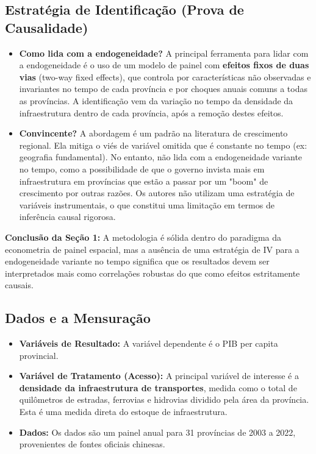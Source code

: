 \documentclass[12pt, a4paper]{article}
\begin{document}
\subsection{Estratégia de Identificação (Prova de Causalidade)}

\begin{itemize}
    \item \textbf{Como lida com a endogeneidade?} A principal ferramenta para lidar com a endogeneidade é o uso de um modelo de painel com \textbf{efeitos fixos de duas vias} (two-way fixed effects), que controla por características não observadas e invariantes no tempo de cada província e por choques anuais comuns a todas as províncias. A identificação vem da variação no tempo da densidade da infraestrutura dentro de cada província, após a remoção destes efeitos.
    \item \textbf{Convincente?} A abordagem é um padrão na literatura de crescimento regional. Ela mitiga o viés de variável omitida que é constante no tempo (ex: geografia fundamental). No entanto, não lida com a endogeneidade variante no tempo, como a possibilidade de que o governo invista mais em infraestrutura em províncias que estão a passar por um "boom" de crescimento por outras razões. Os autores não utilizam uma estratégia de variáveis instrumentais, o que constitui uma limitação em termos de inferência causal rigorosa.
\end{itemize}

\noindent\textbf{Conclusão da Seção 1:} A metodologia é sólida dentro do paradigma da econometria de painel espacial, mas a ausência de uma estratégia de IV para a endogeneidade variante no tempo significa que os resultados devem ser interpretados mais como correlações robustas do que como efeitos estritamente causais.

\subsection{Dados e a Mensuração}

\begin{itemize}
    \item \textbf{Variáveis de Resultado:} A variável dependente é o PIB per capita provincial.
    \item \textbf{Variável de Tratamento (Acesso):} A principal variável de interesse é a \textbf{densidade da infraestrutura de transportes}, medida como o total de quilômetros de estradas, ferrovias e hidrovias dividido pela área da província. Esta é uma medida direta do estoque de infraestrutura.
    \item \textbf{Dados:} Os dados são um painel anual para 31 províncias de 2003 a 2022, provenientes de fontes oficiais chinesas.
\end{itemize}
\end{document}
